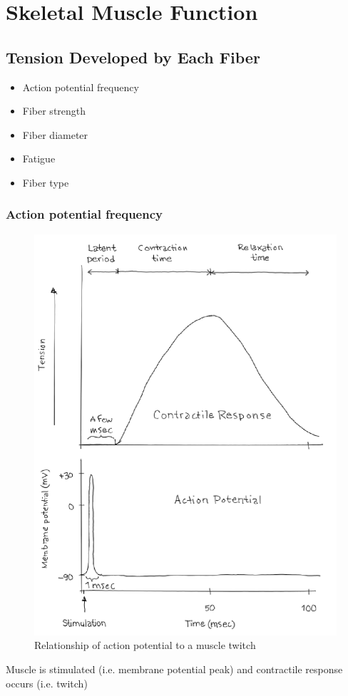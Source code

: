 \documentclass[11pt,fleqn]{book} %
\begin{document}
\section{Skeletal Muscle Function}
\subsection{Tension Developed by Each Fiber}
\begin{itemize}
    \item Action potential frequency
    \item Fiber strength
    \item Fiber diameter
    \item Fatigue
    \item Fiber type
\end{itemize}

\subsubsection{Action potential frequency}
\begin{figure}[h!]
\begin{center}
    \includegraphics[width=0.5\linewidth]{Pictures/Screenshot 2024-04-03 225713.png}
    \caption{Relationship of action potential to a muscle twitch}
\end{center}
\end{figure}

\begin{remark}
    Muscle is stimulated (i.e. membrane
potential peak) and contractile
response occurs (i.e. twitch)
\end{remark}
\end{document}
